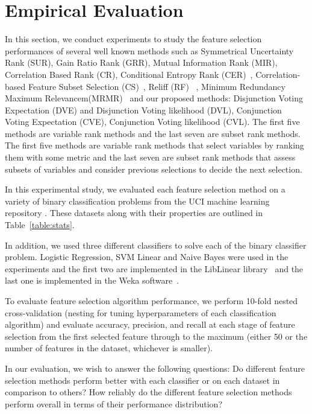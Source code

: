 \section{Empirical Evaluation}

In this section, we conduct experiments to study the feature selection
performances of several well known methods such as Symmetrical
Uncertainty Rank (SUR), Gain Ratio Rank (GRR), Mutual Information Rank
(MIR), Correlation Based Rank (CR), Conditional Entropy Rank (CER)~\cite{guyon_jmlr03}, Correlation-based Feature Subset Selection (CS)~\cite{Hall1998}, Reliff (RF)~\cite{Robnik-Sikonja2003} , Minimum Redundancy Maximum Relevancem(MRMR)~\cite{peng2005} and our proposed methods:  Disjunction Voting Expectation (DVE) and  Disjunction Voting likelihood (DVL), Conjunction Voting Expectation (CVE), Conjunction Voting likelihood (CVL). The first five methods are variable rank methods and the last seven are subset rank methods. The first five methods are variable rank methods that select variables by ranking them with some metric and the last seven are subset rank methods that assess subsets of variables and consider previous selections to decide the next selection.

In this experimental study, we evaluated each feature selection
method on a variety of binary classification problems 
from the UCI machine learning repository \cite{Bache+Lichman:2013}.
These datasets along with their properties are outlined in 
Table~\ref{table:stats}.

In addition, we used three different classifiers to solve each of the
binary classifier problem. Logistic Regression, SVM Linear and Naive
Bayes were used in the experiments and the first two are implemented
in the LibLinear library~\cite{REF08a} and the last one is implemented in
the Weka software~\cite{weka}.
 
To evaluate feature selection algorithm performance, we perform 
10-fold nested cross-validation (nesting for tuning hyperparameters of each classification
algorithm) and evaluate accuracy, precision, and recall at each stage of
feature selection from the first selected feature through to the maximum
(either 50 or the number of features in the dataset, whichever is smaller).

In our evaluation, we wish to answer the following questions:
Do different feature selection methods perform better with
each classifier or on each dataset in comparison to others?
How reliably do the different feature selection methods perform overall
in terms of their performance distribution?

